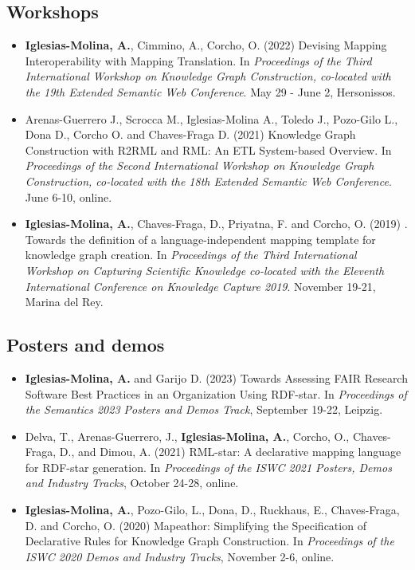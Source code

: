 \subsection{Workshops}
\begin{itemize}
    \item \textbf{Iglesias-Molina, A.}, Cimmino, A., Corcho, O. (2022) Devising Mapping Interoperability with Mapping Translation. In \textit{Proceedings of the Third International Workshop on Knowledge Graph Construction, co-located with the 19th Extended Semantic Web Conference}. May 29 - June 2, Hersonissos. 

    \item Arenas-Guerrero J., Scrocca M., Iglesias-Molina A., Toledo J., Pozo-Gilo L., Dona D., Corcho O. and Chaves-Fraga D. (2021) Knowledge Graph Construction with R2RML and RML: An ETL System-based Overview. In \textit{Proceedings of the Second International Workshop on Knowledge Graph Construction, co-located with the 18th Extended Semantic Web Conference}. June 6-10, online.
    
    \item \textbf{Iglesias-Molina, A.}, Chaves-Fraga, D., Priyatna, F. and Corcho, O. (2019) . Towards the definition of a language-independent mapping template for knowledge graph creation. In \textit{Proceedings of the Third International Workshop on Capturing Scientific Knowledge co-located with the Eleventh International Conference on Knowledge Capture 2019}. November 19-21, Marina del Rey.
\end{itemize}

\subsection{Posters and demos}
\begin{itemize}
    \item \textbf{Iglesias-Molina, A.} and Garijo D. (2023) Towards Assessing FAIR Research Software Best Practices in an Organization Using RDF-star. In \textit{Proceedings of the Semantics 2023 Posters and Demos Track}, September 19-22, Leipzig.
    
    \item Delva, T., Arenas-Guerrero, J., \textbf{Iglesias-Molina, A.}, Corcho, O., Chaves-Fraga, D., and Dimou, A. (2021) RML-star: A declarative mapping language for RDF-star generation. In \textit{Proceedings of the ISWC 2021 Posters, Demos and Industry Tracks}, October 24-28, online.

    \item \textbf{Iglesias-Molina, A.}, Pozo-Gilo, L., Dona, D., Ruckhaus, E., Chaves-Fraga, D. and Corcho, O. (2020) Mapeathor: Simplifying the Specification of Declarative Rules for Knowledge Graph Construction. In \textit{Proceedings of the ISWC 2020 Demos and Industry Tracks}, November 2-6, online.
\end{itemize}


